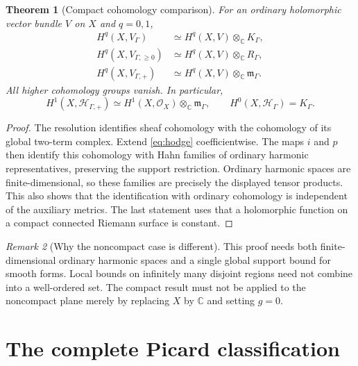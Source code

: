 \documentclass[11pt,letterpaper]{article}
\numberwithin{equation}{section}
\newtheorem{theorem}{Theorem}[section]
\theoremstyle{definition}
\theoremstyle{remark}
\newtheorem{remark}[theorem]{Remark}
\newcommand{\C}{\mathbb C}
\newcommand{\HH}{\mathcal H}
\newcommand{\OO}{\mathcal O}
\newcommand{\mm}{\mathfrak m}
\newcommand{\Hp}{\HH_{\Gamma,+}}
\newcommand{\Hg}{\HH_\Gamma}
\newcommand{\Kg}{K_\Gamma}
\newcommand{\rg}{R_\Gamma}
\newcommand{\mg}{\mm_\Gamma}
\newcommand{\ot}{\otimes_{\C}}
\begin{document}
\begin{theorem}[Compact cohomology comparison]
\label{thm:comparison}
For an ordinary holomorphic vector bundle $V$ on $X$ and $q=0,1$,
\begin{align}
 H^q(X,V_\Gamma)&\simeq H^q(X,V)\ot\Kg,\label{eq:compareK}\\
 H^q(X,V_{\Gamma,\ge0})&\simeq H^q(X,V)\ot\rg,\label{eq:compareR}\\
 H^q(X,V_{\Gamma,+})&\simeq H^q(X,V)\ot\mg.\label{eq:comparem}
\end{align}
All higher cohomology groups vanish. In particular,
\[
 H^1(X,\Hp)\simeq H^1(X,\OO_X)\ot\mg,
 \qquad H^0(X,\Hg)=\Kg.
\]
\end{theorem}
\begin{proof}
The resolution identifies sheaf cohomology with the cohomology of its
global two-term complex. Extend \eqref{eq:hodge} coefficientwise.
The maps $i$ and $p$ then identify this cohomology with Hahn families
of ordinary harmonic representatives, preserving the support restriction.
Ordinary harmonic spaces are finite-dimensional, so these families are
precisely the displayed tensor products. This also shows that the
identification with ordinary cohomology is independent of the auxiliary
metrics. The last statement uses that a holomorphic function on a compact
connected Riemann surface is constant.
\end{proof}

\begin{remark}[Why the noncompact case is different]
This proof needs both finite-dimensional ordinary harmonic spaces and a
single global support bound for smooth forms. Local bounds on infinitely
many disjoint regions need not combine into a well-ordered set. The
compact result must not be applied to the noncompact plane merely by
replacing $X$ by $\C$ and setting $g=0$.
\end{remark}

\section{The complete Picard classification}
\label{sec:pic}
\end{document}
